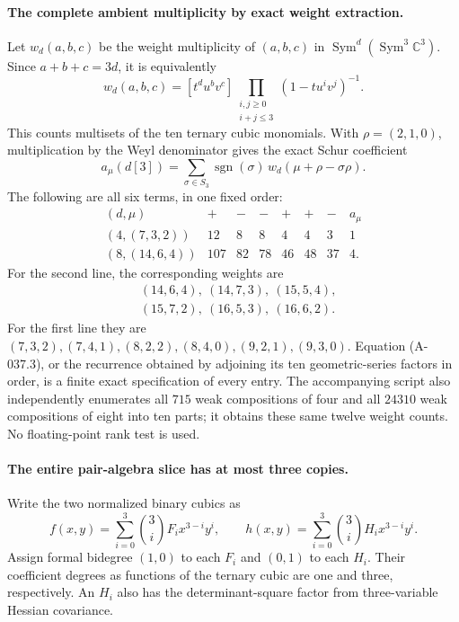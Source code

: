 \paragraph{The complete ambient multiplicity by exact weight extraction.}
Let \(w_d(a,b,c)\) be the weight multiplicity of
\((a,b,c)\) in \(\operatorname{Sym}^d(\operatorname{Sym}^3\mathbb C^3)\).
Since \(a+b+c=3d\), it is equivalently
\[
 w_d(a,b,c)=[t^d u^b v^c]
          \prod_{\substack{i,j\geq0\\i+j\leq3}}
                            (1-tu^iv^j)^{-1}.                 \tag{A-037.3}
\]
This counts multisets of the ten ternary cubic
monomials. With \(\rho=(2,1,0)\), multiplication
by the Weyl denominator gives the exact Schur
coefficient
\[
 a_\mu(d[3])
       =\sum_{\sigma\in S_3}
                      \operatorname{sgn}(\sigma)\,
                             w_d(\mu+\rho-\sigma\rho).
                                                               \tag{A-037.4}
\]
The following are all six terms, in one fixed order:
\[
 \begin{array}{c|rrrrrr|r}
 (d,\mu)&+&-&-&+&+&-&a_\mu\\ \hline
 (4,(7,3,2))&12&8&8&4&4&3&1\\
 (8,(14,6,4))&107&82&78&46&48&37&4.
 \end{array}                                                   \tag{A-037.5}
\]
For the second line, the corresponding weights are
\[
 \begin{split}
 &(14,6,4),\ (14,7,3),\ (15,5,4),\\
 &(15,7,2),\ (16,5,3),\ (16,6,2).
 \end{split}
\]
For the first line they are
\((7,3,2),(7,4,1),(8,2,2),(8,4,0),(9,2,1),(9,3,0)\).
Equation (A-037.3), or the recurrence obtained by
adjoining its ten geometric-series factors in
order, is a finite exact specification of every
entry. The accompanying script also independently
enumerates all \(715\) weak compositions of four
and all \(24310\) weak compositions of eight into
ten parts; it obtains these same twelve weight
counts. No floating-point rank test is used.

\paragraph{The entire pair-algebra slice has at most three copies.}
Write the two normalized binary cubics as
\[
 f(x,y)=\sum_{i=0}^3\binom3i F_i x^{3-i}y^i,\qquad
 h(x,y)=\sum_{i=0}^3\binom3i H_i x^{3-i}y^i.
\]
Assign formal bidegree \((1,0)\) to each \(F_i\)
and \((0,1)\) to each \(H_i\).
Their coefficient degrees as functions of the
ternary cubic are one and three, respectively.
An \(H_i\) also has the determinant-square factor
from three-variable Hessian covariance.

